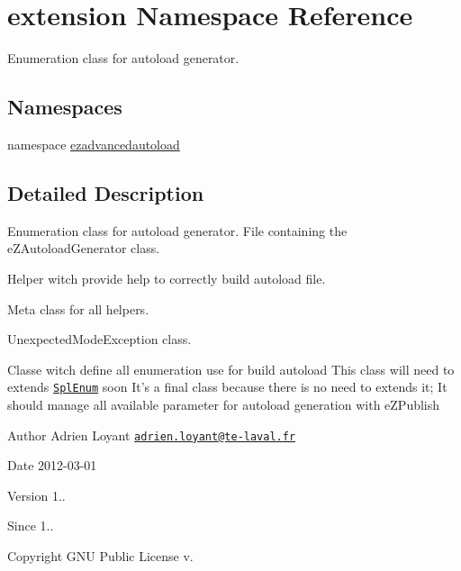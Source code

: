 \hypertarget{namespaceextension}{\section{extension Namespace Reference}
\label{namespaceextension}
}


Enumeration class for autoload generator.  


\subsection*{Namespaces}
\begin{DoxyCompactItemize}
\item 
namespace \hyperlink{namespaceextension_1_1ezadvancedautoload}{ezadvancedautoload}
\end{DoxyCompactItemize}


\subsection{Detailed Description}
Enumeration class for autoload generator. File containing the e\-Z\-Autoload\-Generator class.

Helper witch provide help to correctly build autoload file.

Meta class for all helpers.

Unexpected\-Mode\-Exception class.

Classe witch define all enumeration use for build autoload This class will need to extends \href{http://php.net/manual/fr/book.spl-types.php}{\tt Spl\-Enum} soon It's a final class because there is no need to extends it; It should manage all available parameter for autoload generation with e\-Z\-Publish

\begin{DoxyAuthor}{Author}
Adrien Loyant \href{mailto:adrien.loyant@te-laval.fr}{\tt adrien.\-loyant@te-\/laval.\-fr}
\end{DoxyAuthor}
\begin{DoxyDate}{Date}
2012-\/03-\/01 
\end{DoxyDate}
\begin{DoxyVersion}{Version}
1.. 
\end{DoxyVersion}
\begin{DoxySince}{Since}
1.. 
\end{DoxySince}
\begin{DoxyCopyright}{Copyright}
G\-N\-U Public License v.
\end{DoxyCopyright}


